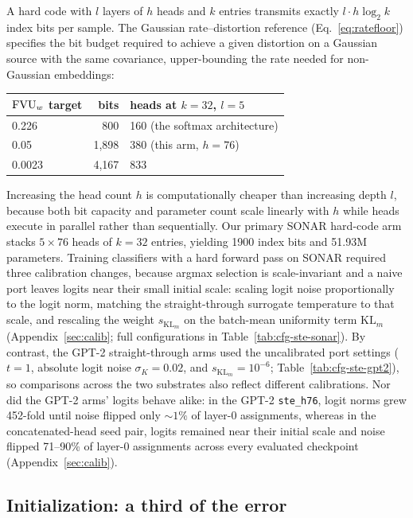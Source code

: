 A hard code with $l$ layers of $h$ heads and $k$ entries transmits exactly
$l\cdot h\log_2 k$ index bits per sample. The Gaussian rate--distortion
reference (Eq.~\eqref{eq:ratefloor}) specifies the bit budget required to
achieve a given distortion on a Gaussian source with the same covariance,
upper-bounding the rate needed for non-Gaussian embeddings:

\begin{center}\small
\begin{tabular}{@{}lrl@{}}
\toprule
$\mathrm{FVU}_w$ target & bits & heads at $k{=}32$, $l{=}5$ \\
\midrule
0.226 & 800 & 160 (the softmax architecture) \\
0.05 & 1{,}898 & 380 (this arm, $h{=}76$) \\
0.0023 & 4{,}167 & 833 \\
\bottomrule
\end{tabular}
\end{center}

Increasing the head count $h$ is computationally cheaper than increasing
depth $l$, because both bit capacity and parameter count scale linearly with
$h$ while heads execute in parallel rather than sequentially. Our primary
SONAR hard-code arm stacks $5\times76$ heads of $k{=}32$ entries, yielding
1900 index bits and 51.93M parameters. Training classifiers with a hard
forward pass on SONAR required three calibration changes, because argmax
selection is scale-invariant and a naive port leaves logits near their small
initial scale: scaling logit noise proportionally to the logit norm,
matching the straight-through surrogate temperature to that scale, and
rescaling the weight $s_{\mathrm{KL}_m}$ on the batch-mean uniformity term
$\mathrm{KL}_m$ (Appendix~\ref{sec:calib}; full configurations in
Table~\ref{tab:cfg-ste-sonar}). By contrast, the GPT-2 straight-through arms
used the uncalibrated port settings ($t{=}1$, absolute logit noise
$\sigma_K{=}0.02$, and $s_{\mathrm{KL}_m}{=}10^{-6}$;
Table~\ref{tab:cfg-ste-gpt2}), so comparisons across the two substrates also
reflect different calibrations. Nor did the GPT-2 arms' logits behave
alike: in the GPT-2 \texttt{ste\_h76}, logit norms grew 452-fold until
noise flipped only ${\sim}1\%$ of layer-0 assignments, whereas in the
concatenated-head seed pair, logits remained near their initial scale and
noise flipped 71--90\% of layer-0 assignments across every evaluated
checkpoint (Appendix~\ref{sec:calib}).

\subsection{Initialization: a third of the error}

